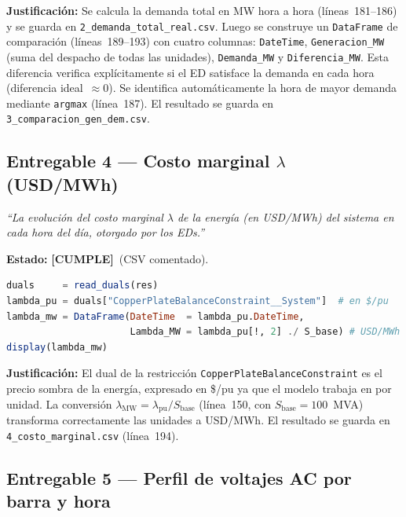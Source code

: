 \documentclass[12pt, a4paper]{article}
\newcommand{\cumple}{\textcolor{okgreen}{\textbf{[CUMPLE]}}}
\begin{document}
\textbf{Justificación:}
Se calcula la demanda total en MW hora a hora (líneas~181--186) y se guarda
en \texttt{2\_demanda\_total\_real.csv}. Luego se construye un
\texttt{DataFrame} de comparación (líneas~189--193) con cuatro columnas:
\texttt{DateTime}, \texttt{Generacion\_MW} (suma del despacho de todas las
unidades), \texttt{Demanda\_MW} y \texttt{Diferencia\_MW}. Esta diferencia
verifica explícitamente si el ED satisface la demanda en cada hora (diferencia
ideal~$\approx 0$). Se identifica automáticamente la hora de mayor demanda
mediante \texttt{argmax} (línea~187). El resultado se guarda en
\texttt{3\_comparacion\_gen\_dem.csv}.

\subsection{Entregable 4 --- Costo marginal $\lambda$ (USD/MWh)}

\begin{enunciadobox}
\textit{``La evolución del costo marginal $\lambda$ de la energía (en USD/MWh)
del sistema en cada hora del día, otorgado por los EDs.''}
\end{enunciadobox}

\textbf{Estado:} \cumple\ (CSV comentado).

\begin{lstlisting}[language=Julia, firstnumber=145,
  caption={Líneas 145--151: extracción y conversión del costo marginal}]
duals     = read_duals(res)
lambda_pu = duals["CopperPlateBalanceConstraint__System"]  # en $/pu
lambda_mw = DataFrame(DateTime  = lambda_pu.DateTime,
                      Lambda_MW = lambda_pu[!, 2] ./ S_base) # USD/MWh
display(lambda_mw)
\end{lstlisting}

\textbf{Justificación:}
El dual de la restricción \texttt{CopperPlateBalanceConstraint} es el precio
sombra de la energía, expresado en \$/pu ya que el modelo trabaja en por
unidad. La conversión $\lambda_\text{MW} = \lambda_\text{pu} / S_\text{base}$
(línea~150, con $S_\text{base}=100$~MVA) transforma correctamente las unidades
a USD/MWh. El resultado se guarda en \texttt{4\_costo\_marginal.csv} (línea~194).

\subsection{Entregable 5 --- Perfil de voltajes AC por barra y hora}
\end{document}
